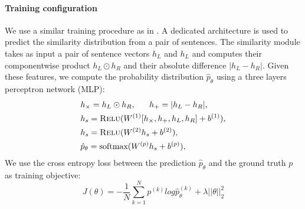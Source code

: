 \paragraph{Training configuration}

We use a similar training procedure as in \textcite{choi_18}. A dedicated architecture is used to predict the similarity distribution from a pair of sentences. The similarity module takes as input a pair of sentence vectors $h_{L} $ and $h_{L}$ and computes their component\-wise product $h_{L} \odot h_{R}$ and their absolute difference $|h_{L} - h_{R}|$. Given these features, we compute the probability distribution  $\hat{p}_{\theta}$ using a three layers perceptron network (MLP):
\begin{align}
\begin{split}
&h_{\times}=h_L\odot h_R, ~~~~~h_{+} = |h_L - h_R |, \\
&h_s = \textsc{Relu}(W^{(1)}[h_{\times}, h_{+}, h_L, h_R] + b^{(1)}), \\
&h_s = \textsc{Relu}(W^{(2)}h_s + b^{(2)}), \\
&\hat{p}_{\theta} = \text{softmax}(W^{(p)}h_s + b^{(p)}),\\
\end{split}
\end{align}
We use the cross entropy loss between the prediction $\hat{p}_{\theta}$ and the ground truth $p$ as training objective:
\begin{equation}
J(\theta) = -\frac{1}{N}\sum_{k=1}^{N}p^{(k)} log \hat{p}_{\theta}^{(k)} + \lambda||\theta||_{2}^{2}
\end{equation}





